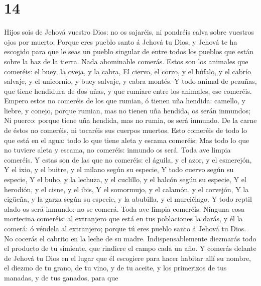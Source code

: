 \hypertarget{section-13}{%
\section{14}\label{section-13}}

 Hijos sois de Jehová vuestro Dios: no os sajaréis, ni
pondréis calva sobre vuestros ojos por muerto;  Porque
eres pueblo santo á Jehová tu Dios, y Jehová te ha escogido para que le
seas un pueblo singular de entre todos los pueblos que están sobre la
haz de la tierra.  Nada abominable comerás. 
Estos son los animales que comeréis: el buey, la oveja, y la cabra,
 El ciervo, el corzo, y el búfalo, y el cabrío salvaje, y
el unicornio, y buey salvaje, y cabra montés.  Y todo
animal de pezuñas, que tiene hendidura de dos uñas, y que rumiare entre
los animales, ese comeréis.  Empero estos no comeréis de
los que rumian, ó tienen uña hendida: camello, y liebre, y conejo,
porque rumian, mas no tienen uña hendida, os serán inmundos;
 Ni puerco: porque tiene uña hendida, mas no rumia, os
será inmundo. De la carne de éstos no comeréis, ni tocaréis sus cuerpos
muertos.  Esto comeréis de todo lo que está en el agua:
todo lo que tiene aleta y escama comeréis;  Mas todo lo
que no tuviere aleta y escama, no comeréis: inmundo os será.
 Toda ave limpia comeréis.  Y estas son de
las que no comeréis: el águila, y el azor, y el esmerejón,
 Y el ixio, y el buitre, y el milano según su especie,
 Y todo cuervo según su especie,  Y el
buho, y la lechuza, y el cuclillo, y el halcón según su especie,
 Y el herodión, y el cisne, y el ibis,  Y
el somormujo, y el calamón, y el corvejón,  Y la cigüeña,
y la garza según su especie, y la abubilla, y el murciélago.
 Y todo reptil alado os será inmundo: no se comerá.
 Toda ave limpia comeréis.  Ninguna cosa
mortecina comeréis: al extranjero que está en tus poblaciones la darás,
y él la comerá: ó véndela al extranjero; porque tú eres pueblo santo á
Jehová tu Dios. No cocerás el cabrito en la leche de su madre.
 Indispensablemente diezmarás todo el producto de tu
simiente, que rindiere el campo cada un año.  Y comerás
delante de Jehová tu Dios en el lugar que él escogiere para hacer
habitar allí su nombre, el diezmo de tu grano, de tu vino, y de tu
aceite, y los primerizos de tus manadas, y de tus ganados, para que
